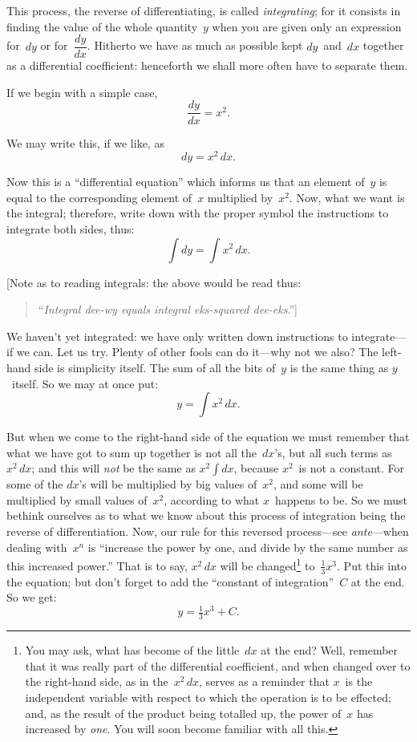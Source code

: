 \documentclass[12pt]{book}[2005/09/16]
\newcommand{\ds}{\displaystyle}
\newcommand{\DPPageSep}[2]{\Pagelabel{#2}}
\newcommand{\Pagelabel}[1]
  {\phantomsection\label{#1}}
\newcommand{\Pageref}[2][p.]{%
  \ifthenelse{\not\equal{#1}{}}{%
    \hyperref[#2]{#1~\pageref*{#2}}%
  }{%
    \hyperref[#2]{\pageref{*#2}}%
  }%
}
\begin{document}
This process, the reverse of differentiating, is called
\emph{integrating}; for it consists in finding the value of
the whole quantity~$y$ when you are given only an
expression for~$dy$ or for~$\dfrac{dy}{dx}$. Hitherto we have as
much as possible kept $dy$~and~$dx$ together as a differential
coefficient: henceforth we shall more often
have to separate them.

If we begin with a simple case,
\[
\frac{dy}{dx} = x^2.
\]

We may write this, if we like, as
\[
dy = x^2\, dx.
\]

Now this is a  ``differential equation''  which informs
us that an element of~$y$ is equal to the corresponding
element of~$x$ multiplied by~$x^2$. Now, what we want
\DPPageSep{206.png}{194}%
is the integral; therefore, write down with the proper
symbol the instructions to integrate both sides, thus:
\[
\int dy = \int x^2\, dx.
\]

[Note as to reading integrals: the above would be
read thus:
\begin{quote}
``\emph{Integral dee-wy \emph{equals} integral eks-squared dee-eks}.'']
\end{quote}

We haven't yet integrated: we have only written
down instructions to integrate---if we can. Let us
try. Plenty of other fools can do it---why not we
also? The left-hand side is simplicity itself. The
sum of all the bits of~$y$ is the same thing as $y$~itself.
So we may at once put:
\[
y = \int x^2\, dx.
\]

But when we come to the right-hand side of the
equation we must remember that what we have got
to sum up together is not all the~$dx$'s, but all such
terms as~$x^2\, dx$; and this will \emph{not} be the same as
$x^2 \ds\int dx$, because $x^2$~is not a constant. For some of the
$dx$'s will be multiplied by big values of~$x^2$, and some
will be multiplied by small values of~$x^2$, according to
what $x$~happens to be. So we must bethink ourselves
as to what we know about this process of integration
being the reverse of differentiation. Now, our rule
for this reversed process---see \Pageref{revdif} \textit{ante}---when
dealing with~$x^n$ is ``increase the power by one, and\Pagelabel{diffrule}
divide by the same number as this increased power.''
\DPPageSep{207.png}{195}%
That is to say, $x^2\, dx$ will be changed\footnote
  {You may ask, what has become of the little~$dx$ at the end?
  Well, remember that it was really part of the differential coefficient,
  and when changed over to the right-hand side, as in the~$x^2\, dx$,
  serves as a reminder that $x$~is the independent variable with respect
  to which the operation is to be effected; and, as the result of the
  product being totalled up, the power of~$x$ has increased by \emph{one}.
  You will soon become familiar with all this.}
to~$\frac{1}{3} x^3$. Put
this into the equation; but don't forget to add the
``constant of integration''~$C$ at the end. So we get:
\[
y = \tfrac{1}{3} x^3 + C.
\]
\end{document}
